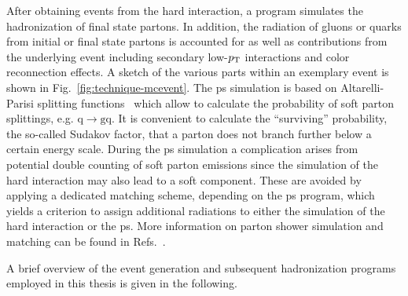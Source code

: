 After obtaining events from the hard interaction, a  program simulates the hadronization of final state partons. In addition, the radiation of gluons or quarks from initial or final state partons is accounted for as well as contributions from the underlying event including secondary low-$p_\mathrm{T}$ interactions and color reconnection effects. A sketch of the various parts within an exemplary event is shown in Fig.~\ref{fig:technique-mcevent}. The \gls{ps} simulation is based on Altarelli-Parisi splitting functions~\cite{Altarelli:1977zs} which allow to calculate the probability of soft parton splittings, e.g. $\mathrm{q}\to \mathrm{gq}$. It is convenient to calculate the ``surviving'' probability, the so-called Sudakov factor, that a parton does not branch further below a certain energy scale. During the \gls{ps} simulation a complication arises from potential double counting of soft parton emissions since the simulation of the hard interaction may also lead to a soft component. These are avoided by applying a dedicated matching scheme, depending on the \gls{ps} program, which yields a criterion to assign additional radiations to either the simulation of the hard interaction or the \gls{ps}. More information on parton shower simulation and matching can be found in Refs.~\cite{Hoche:2014rga,Hoche:2006ph}.



A brief overview of the event generation and subsequent hadronization programs employed in this thesis is given in the following.

